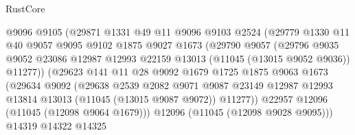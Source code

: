 \begin{lexlean}{RustCore}
\begin{coremodule}
                            @9096
                            @9105
                            (@29871
                              @1331
                              @49
                              @11
                              @9096
                              @9103
                              @2524
                              (@29779
                                @1330
                                @11
                                @40
                                @9057
                                @9095
                                @9102
                                @1875
                                @9027
                                @1673
                                (@29790
                                  @9057
                                  (@29796
                                    @9035
                                    @9052
                                    @23086
                                    @12987
                                    @12993
                                    @22159
                                    @13013
                                    (@11045 (@13015 @9052 @9036))
                                    @11277))
                                (@29623
                                  @141
                                  @11
                                  @28
                                  @9092
                                  @1679
                                  @1725
                                  @1875
                                  @9063
                                  @1673
                                  (@29634
                                    @9092
                                    (@29638
                                      @2539
                                      @2082
                                      @9071
                                      @9087
                                      @23149
                                      @12987
                                      @12993
                                      @13814
                                      @13013
                                      (@11045 (@13015 @9087 @9072))
                                      @11277))
                                  @22957
                                  @12096
                                  (@11045 (@12098 @9064 @1679)))
                                @12096
                                (@11045 (@12098 @9028 @9095)))
                              @14319
                              @14322
                              @14325

\end{coremodule}
\end{lexlean}
